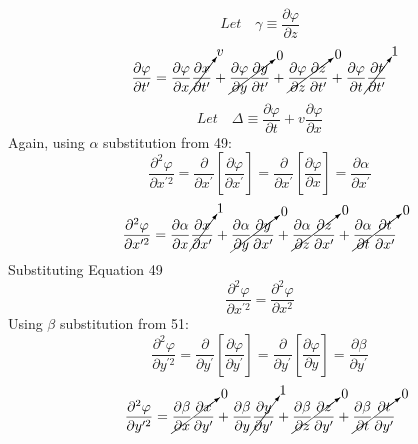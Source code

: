 \documentclass[journal]{IEEEtran}
\begin{document}
\begin{equation}
\boxed{
Let\quad\gamma\equiv\frac{\partial\varphi}{\partial z}
}
\end{equation}
\begin{equation}
\frac{\partial\varphi}{\partial t^{\prime}} =
\frac{\partial\varphi}{\partial x}\cancelto{v}{\frac{\partial x}
{\partial t^\prime}} +
\cancelto{0}{\frac{\partial\varphi}{\partial y}\frac{\partial y}
{\partial t^{\prime}}} +
\cancelto{0}{\frac{\partial\varphi}{\partial z}\frac{\partial z}
{\partial t^{\prime}}} +
\frac{\partial\varphi}{\partial t}\cancelto{1}{\frac{\partial t}
{\partial t^{\prime}}}
\end{equation}
\begin{equation}
\boxed{
Let\quad\Delta\equiv\frac{\partial\varphi}{\partial t} +
v\frac{\partial\varphi}{\partial x}
}
\end{equation}
Again, using \underline{$\alpha$} substitution from 49:
\begin{equation}
\frac{\partial^2\varphi}{\partial x^{\prime 2}}=
\frac{\partial}{\partial x^{\prime}}\left[\frac{\partial\varphi}
{\partial x^{\prime}}\right]=\frac{\partial}{\partial x^{\prime}}
\left[\frac{\partial\varphi}{\partial x}\right]=
\frac{\partial\alpha}{\partial x^{\prime}}
\end{equation}
\begin{equation}
\frac{\partial^2\varphi}{\partial x^{\prime 2}}=
\frac{\partial\alpha}{\partial x}
\cancelto{1}{\frac{\partial x}{\partial x^{\prime}}} +
\cancelto{0}{\frac{\partial\alpha}{\partial y}\frac{\partial y}
{\partial x^{\prime}}}+
\cancelto{0}{\frac{\partial\alpha}{\partial z}\frac{\partial z}
{\partial x^{\prime}}}+
\cancelto{0}{\frac{\partial\alpha}{\partial t}\frac{\partial t}
{\partial x^{\prime}}}
\end{equation}
Substituting Equation 49
\begin{equation}
\boxed{
\frac{\partial^2\varphi}{\partial x^{\prime 2}}=
\frac{\partial^2\varphi}{\partial x^2}
}
\end{equation}
Using \underline{$\beta$} substitution from 51:
\begin{equation}
\frac{\partial^2\varphi}{\partial y^{\prime 2}}=
\frac{\partial}{\partial y^{\prime}}\left[\frac{\partial\varphi}
{\partial y^{\prime}}\right]=\frac{\partial}{\partial y^{\prime}}
\left[\frac{\partial\varphi}{\partial y}\right]=
\frac{\partial\beta}{\partial y^{\prime}}
\end{equation}
\begin{equation}
\frac{\partial^2\varphi}{\partial y^{\prime 2}}=
\cancelto{0}{\frac{\partial\beta}{\partial x}\frac{\partial x}
{\partial y^{\prime}}} +
\frac{\partial\beta}{\partial y}
\cancelto{1}{\frac{\partial y}{\partial y^{\prime}}}+
\cancelto{0}{\frac{\partial\beta}{\partial z}\frac{\partial z}
{\partial y^{\prime}}} +
\cancelto{0}{\frac{\partial\beta}{\partial t}\frac{\partial t}
{\partial y^{\prime}}}
\end{equation}
\end{document}
